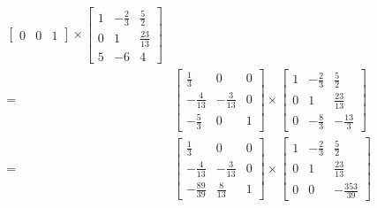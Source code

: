 \documentclass{article}
\begin{document}
\begin{equation*}
\begin{split}
\begin{bmatrix}
                    0&0&1
                \end{bmatrix}\times
                \begin{bmatrix}
                    1&-\frac{2}{3}&\frac{5}{2}\\
                    0&1&\frac{23}{13}\\
                    5&-6&4
                \end{bmatrix}\\
                =&\begin{bmatrix}
                    \frac{1}{3}&0&0\\
                    -\frac{4}{13}&-\frac{3}{13}&0\\
                    -\frac{5}{3}&0&1
                \end{bmatrix}\times\begin{bmatrix}
                    1&-\frac{2}{3}&\frac{5}{2}\\
                    0&1&\frac{23}{13}\\
                    0&-\frac{8}{3}&-\frac{13}{3}
                \end{bmatrix}\\
                =&\begin{bmatrix}
                    \frac{1}{3}&0&0\\
                    -\frac{4}{13}&-\frac{3}{13}&0\\
                    -\frac{89}{39}&\frac{8}{13}&1
                \end{bmatrix}\times\begin{bmatrix}
                    1&-\frac{2}{3}&\frac{5}{2}\\
                    0&1&\frac{23}{13}\\
                    0&0&-\frac{353}{39}
                \end{bmatrix}
            \end{split}
        \end{equation*}
\end{document}
